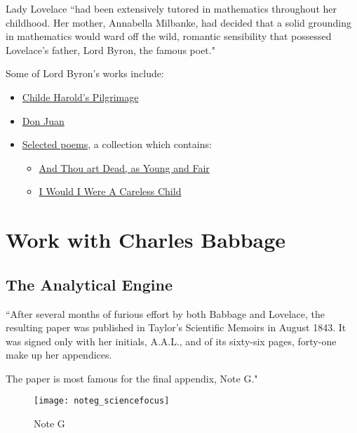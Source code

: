 \documentclass[12pt, xcolor=dvipsnames]{beamer}
\begin{document}
\begin{frame}
\begin{center} 
{\bf \secname} 
\end{center}

Lady Lovelace ``had been extensively tutored in mathematics throughout her childhood. Her mother, Annabella Milbanke, had decided that a solid grounding in mathematics would ward off the wild, romantic sensibility that possessed Lovelace’s father, Lord Byron, the famous poet." \cite{twobit}

Some of Lord Byron's works include: \pause

\begin{itemize}
\item \href{https://www.biblio.com/childe-harolds-pilgrimage-by-byron-lord/work/15593}{Childe Harold's Pilgrimage} \pause
\item \href{https://www.biblio.com/don-juan-by-byron-lord/work/15592}{Don Juan} \pause
\item \href{https://www.biblio.com/selected-poems-of-lord-byron-by-byron-lord/work/775652}{Selected poems}, a collection which contains: \pause
\begin{itemize}
\item \href{https://www.poetryfoundation.org/poems/43822/and-thou-art-dead-as-young-and-fair}{And Thou art Dead, as Young and Fair} \pause
\item \href{https://englishhistory.net/byron/poems/careless-child/}{I Would I Were A Careless Child}
\end{itemize}
\end{itemize}

\end{frame}

\section{Work with Charles Babbage}

\subsection{The Analytical Engine}

\begin{frame}
\begin{center} 
{\bf \secname} 
\end{center}

``After several months of furious effort by both Babbage and Lovelace, the resulting paper was published in Taylor’s Scientific Memoirs in August 1843. It was signed only with her initials, A.A.L., and of its sixty-six pages, forty-one make up her appendices. 

The paper is most famous for the final appendix, Note G." \cite{sciencefocus} \cite{sciencefocusadapted} 

\pause

\begin{figure}[h]
\texttt{[image: noteg\_sciencefocus]}
\caption{Note G}
\label{noteg}
\end{figure}

\end{frame}
\end{document}
